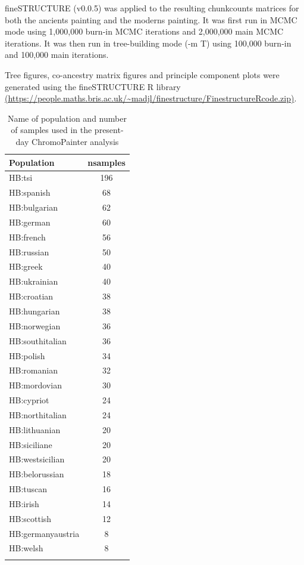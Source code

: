 fineSTRUCTURE (v0.0.5) was applied to the resulting chunkcounts matrices for both the ancients painting and the moderns painting. It was first run in MCMC mode using 1,000,000 burn-in MCMC iterations and 2,000,000 main MCMC iterations. It was then run in tree-building mode (-m T) using 100,000 burn-in and 100,000 main iterations. 

Tree figures, co-ancestry matrix figures and principle component plots were generated using the fineSTRUCTURE R library \url{(https://people.maths.bris.ac.uk/~madjl/finestructure/FinestructureRcode.zip)}.

\begin{table}
\small
\begin{tabular}{l|c}
\hline
Population & nsamples\\
\hline
HB:tsi & 196\\
\hline
HB:spanish & 68\\
\hline
HB:bulgarian & 62\\
\hline
HB:german & 60\\
\hline
HB:french & 56\\
\hline
HB:russian & 50\\
\hline
HB:greek & 40\\
\hline
HB:ukrainian & 40\\
\hline
HB:croatian & 38\\
\hline
HB:hungarian & 38\\
\hline
HB:norwegian & 36\\
\hline
HB:southitalian & 36\\
\hline
HB:polish & 34\\
\hline
HB:romanian & 32\\
\hline
HB:mordovian & 30\\
\hline
HB:cypriot & 24\\
\hline
HB:northitalian & 24\\
\hline
HB:lithuanian & 20\\
\hline
HB:siciliane & 20\\
\hline
HB:westsicilian & 20\\
\hline
HB:belorussian & 18\\
\hline
HB:tuscan & 16\\
\hline
HB:irish & 14\\
\hline
HB:scottish & 12\\
\hline
HB:germanyaustria & 8\\
\hline
HB:welsh & 8\\
\hline
\label{table:present-day_inds_painting}
\end{tabular}
\caption{Name of population and number of samples used in the present-day ChromoPainter analysis}
\end{table}


